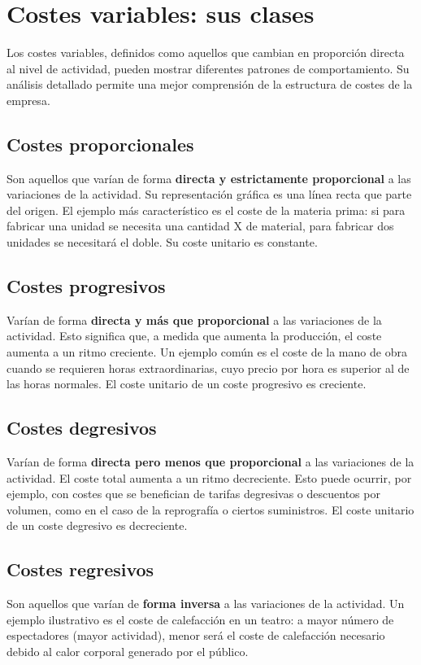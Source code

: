 \section{Costes variables: sus clases}
Los costes variables, definidos como aquellos que cambian en proporción directa al nivel de actividad, pueden mostrar diferentes patrones de comportamiento. Su análisis detallado permite una mejor comprensión de la estructura de costes de la empresa.

\subsection{Costes proporcionales}
Son aquellos que varían de forma \textbf{directa y estrictamente proporcional} a las variaciones de la actividad. Su representación gráfica es una línea recta que parte del origen. El ejemplo más característico es el coste de la materia prima: si para fabricar una unidad se necesita una cantidad X de material, para fabricar dos unidades se necesitará el doble. Su coste unitario es constante.

\subsection{Costes progresivos}
Varían de forma \textbf{directa y más que proporcional} a las variaciones de la actividad. Esto significa que, a medida que aumenta la producción, el coste aumenta a un ritmo creciente. Un ejemplo común es el coste de la mano de obra cuando se requieren horas extraordinarias, cuyo precio por hora es superior al de las horas normales. El coste unitario de un coste progresivo es creciente.

\subsection{Costes degresivos}
Varían de forma \textbf{directa pero menos que proporcional} a las variaciones de la actividad. El coste total aumenta a un ritmo decreciente. Esto puede ocurrir, por ejemplo, con costes que se benefician de tarifas degresivas o descuentos por volumen, como en el caso de la reprografía o ciertos suministros. El coste unitario de un coste degresivo es decreciente.

\subsection{Costes regresivos}
Son aquellos que varían de \textbf{forma inversa} a las variaciones de la actividad. Un ejemplo ilustrativo es el coste de calefacción en un teatro: a mayor número de espectadores (mayor actividad), menor será el coste de calefacción necesario debido al calor corporal generado por el público.



